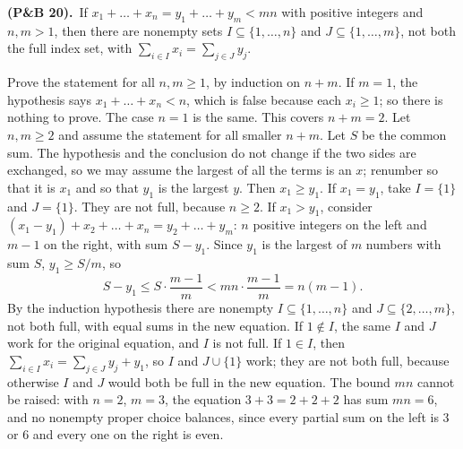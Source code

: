 \documentclass[10pt]{scrartcl}
\begin{document}
\begin{prob}\textbf{ (P\&B 20).}\ If $x_1 + \dots + x_n = y_1 + \dots + y_m < mn$ with positive integers and $n, m > 1$, then there are nonempty sets $I \subseteq \{1, \dots, n\}$ and $J \subseteq \{1, \dots, m\}$, not both the full index set, with $\sum_{i \in I} x_i = \sum_{j \in J} y_j$.\par
{}
\begin{steps}
  \ii Prove the statement for all $n, m \geq 1$, by induction on $n + m$. If $m = 1$, the hypothesis says $x_1 + \dots + x_n < n$, which is false because each $x_i \geq 1$; so there is nothing to prove. The case $n = 1$ is the same. This covers $n + m = 2$.
  \ii Let $n, m \geq 2$ and assume the statement for all smaller $n + m$. Let $S$ be the common sum. The hypothesis and the conclusion do not change if the two sides are exchanged, so we may assume the largest of all the terms is an $x$; renumber so that it is $x_1$ and so that $y_1$ is the largest $y$. Then $x_1 \geq y_1$.
  \ii If $x_1 = y_1$, take $I = \{1\}$ and $J = \{1\}$. They are not full, because $n \geq 2$.
  \ii If $x_1 > y_1$, consider $(x_1 - y_1) + x_2 + \dots + x_n = y_2 + \dots + y_m$: $n$ positive integers on the left and $m - 1$ on the right, with sum $S - y_1$. Since $y_1$ is the largest of $m$ numbers with sum $S$, $y_1 \geq S/m$, so
  \[ S - y_1 \leq S\cdot\frac{m-1}{m} < mn \cdot \frac{m-1}{m} = n(m-1). \]
  \ii By the induction hypothesis there are nonempty $I \subseteq \{1, \dots, n\}$ and $J \subseteq \{2, \dots, m\}$, not both full, with equal sums in the new equation. If $1 \notin I$, the same $I$ and $J$ work for the original equation, and $I$ is not full. If $1 \in I$, then $\sum_{i \in I} x_i = \sum_{j \in J} y_j + y_1$, so $I$ and $J \cup \{1\}$ work; they are not both full, because otherwise $I$ and $J$ would both be full in the new equation.
  \ii The bound $mn$ cannot be raised: with $n = 2$, $m = 3$, the equation $3 + 3 = 2 + 2 + 2$ has sum $mn = 6$, and no nonempty proper choice balances, since every partial sum on the left is $3$ or $6$ and every one on the right is even.
\end{steps}
\end{prob}
\end{document}
